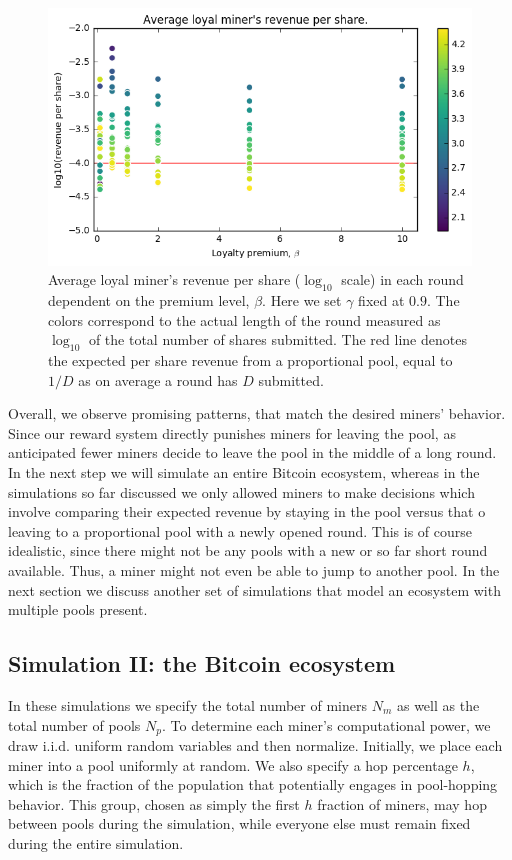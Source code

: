 \documentclass{article}
\theoremstyle{plain}
\theoremstyle{definition}
\begin{document}
\begin{figure}[h]
\center
\includegraphics[width = .7\textwidth]
{figures/loyal_miners_revenue.png}
\caption{Average loyal miner's revenue per share ($\log_{10}$ scale)
in each round dependent on the premium level, $\beta$. Here we set 
$\gamma$ fixed at $0.9$. 
The colors correspond to the actual length of the round measured
as $\log_{10}$ of the total number of shares submitted. The red line
denotes the expected per share revenue from a proportional pool, equal
to $1/D$ as on average a round has $D$ submitted.}
\label{fig:loyal_rev}
\end{figure}

Overall, we observe promising patterns, that match the 
desired miners' behavior. Since our reward system directly punishes 
miners for leaving the pool, as anticipated fewer miners decide
to leave the pool in the middle of a long round. In the next step
we will simulate an entire Bitcoin ecosystem, whereas in the simulations
so far discussed we only allowed miners to make decisions which involve
comparing their expected revenue by staying in the pool versus
that o leaving to a proportional pool with a newly opened round.
This is of course idealistic, since there might not be any
pools with a new or so far short round available. Thus, a miner
might not even be able to jump to another pool. In the next
section we discuss another set of simulations that model 
an ecosystem with multiple pools present.


\subsection{Simulation II: the Bitcoin ecosystem}
In these simulations we specify the total number of miners $N_m$ as well as the total number of pools $N_p$. To determine each miner's computational power, we draw i.i.d. uniform random variables and then normalize. Initially, we place each miner into a pool uniformly at random. We also specify a hop percentage $h$, which is the fraction of the population that potentially engages in pool-hopping behavior. This group, chosen as simply the first $h$ fraction of miners, may hop between pools during the simulation, while everyone else must remain fixed during the entire simulation.
\end{document}
